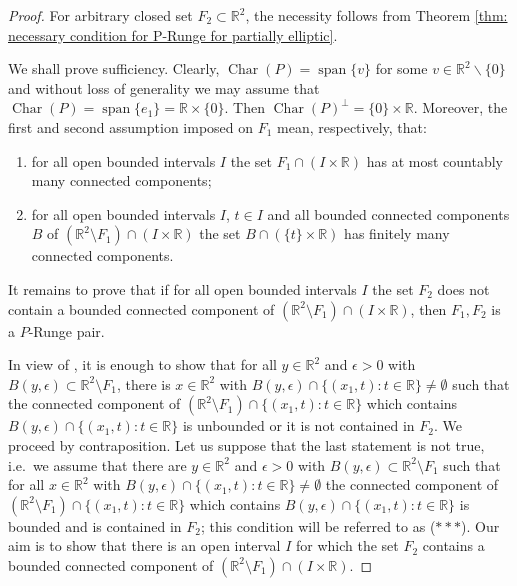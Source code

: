 \documentclass[a4paper,10pt]{amsart}
\newtheorem*{crucial lemma}{Lemma \ref{lem:nice polynomial2}}
\theoremstyle{definition}
\newcommand{\R}{\mathbb{R}}
\newcommand{\charcone}{\operatorname{Char}}
\begin{document}
\begin{proof}
For arbitrary closed set $F_2\subset\R^2$, the necessity follows from Theorem \ref{thm: necessary condition for P-Runge for partially elliptic}.

We shall prove sufficiency. Clearly, $\charcone(P)=\operatorname{span}\{v\}$ for some $v\in\R^2\backslash\{0\}$ and without loss of generality we may assume that $\charcone(P)=\operatorname{span}\{e_1\}=\R\times\{0\}$. Then $\charcone(P)^\perp=\{0\}\times\R$. Moreover, the first and second assumption imposed on $F_1$ mean, respectively, that:
\begin{enumerate}
    \item[($\ast$)] for all open bounded intervals $I$ the set $F_1\cap (I\times\R)$ has at most countably many connected components;
    \item[($\ast\ast$)] for all open bounded intervals $I$, $t\in I$ and all bounded connected components $B$ of $(\R^2\setminus F_1)\cap (I\times\R)$ the set $B\cap (\{t\}\times\R)$ has finitely many connected components.
\end{enumerate}
It remains to prove that if for all open bounded intervals $I$ the set $F_2$ does not contain a bounded connected component of $(\R^2\setminus F_1)\cap (I\times\R)$, then $F_1,F_2$ is a $P$-Runge pair.

In view of \cite[(iii)$\Rightarrow$(i) in Theorem 16]{CiasKalmes2025}, it is enough to show that for all $y\in\R^2$ and $\epsilon>0$ with $B(y,\epsilon)\subset\R^2\setminus F_1$, there is $x\in\R^2$ with $B(y,\epsilon)\cap \{(x_1,t)\colon t\in\R\}\neq\emptyset$ such that the connected component of $(\R^2\setminus F_1)\cap\{(x_1,t)\colon t\in\R\}$ which contains $B(y,\epsilon)\cap \{(x_1,t)\colon t\in\R\}$ is unbounded or it is not contained in $F_2$. We proceed by contraposition. Let us suppose that the last statement is not true, i.e.~we assume that
there are $y\in\R^2$ and $\epsilon>0$ with $B(y,\epsilon)\subset \R^2\setminus F_1$ such that for all $x\in\R^2$ with $B(y,\epsilon)\cap \{(x_1,t)\colon t\in\R\}\neq\emptyset$ the connected component of $(\R^2\setminus F_1)\cap\{(x_1,t)\colon t\in\R\}$ which contains $B(y,\epsilon)\cap \{(x_1,t)\colon t\in\R\}$ is bounded and is contained in $F_2$; this condition will be referred to as ($\ast\ast\ast$). 
Our aim is to show that there is an open interval $I$ for which the set $F_2$ contains a bounded connected component of $(\R^2\setminus F_1)\cap (I\times\R)$.


\end{proof}
\end{document}
